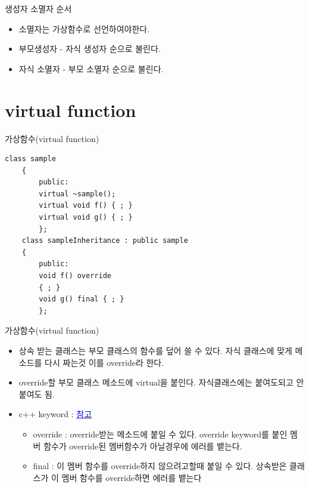\documentclass[10pt]{beamer}
\begin{document}
\begin{frame}[fragile]{생성자 소멸자 순서}
    \begin{itemize}
        \item 소멸자는 가상함수로 선언하여야한다.
        \item 부모생성자 - 자식 생성자 순으로 불린다.
        \item 자식 소멸자 - 부모 소멸자 순으로 불린다.
    \end{itemize}
\end{frame}    


\section{virtual function}

\begin{frame}[fragile]{가상함수(virtual function)}
    \begin{lstlisting}[style = CppStyle]
    class sample
    {
        public:
        virtual ~sample();
        virtual void f() { ; }
        virtual void g() { ; }
        };
    class sampleInheritance : public sample
    {
        public:
        void f() override
        { ; }
        void g() final { ; }
        };
    \end{lstlisting}
\end{frame}

\begin{frame}[fragile]{가상함수(virtual function)}
    \begin{itemize}
        \item 상속 받는 클래스는 부모 클래스의 함수를 덮어 쓸 수 있다. 자식 클래스에 맞게 메소드를 다시 짜는것 이를 override라 한다.
        \item override할 부모 클래스 메소드에 virtual을 붙인다. 자식클래스에는 붙여도되고 안붙여도 됨.
        \item c++ keyword : \href{https://youtu.be/JMw0F8FFe80}{\textcolor{blue}{참고}}
        \begin{itemize}
            \item  override : override받는 메소드에 붙일 수 있다. override keyword를 붙인 멤버 함수가 override된 멤버함수가 아닐경우에 에러를 뱉는다.
            \item  final : 이 멤버 함수를 override하지 않으려고할때 붙일 수 있다. 상속받은 클래스가 이 멤버 함수를 override하면 에러를 뱉는다
        \end{itemize}
    \end{itemize}
\end{frame}
\end{document}
